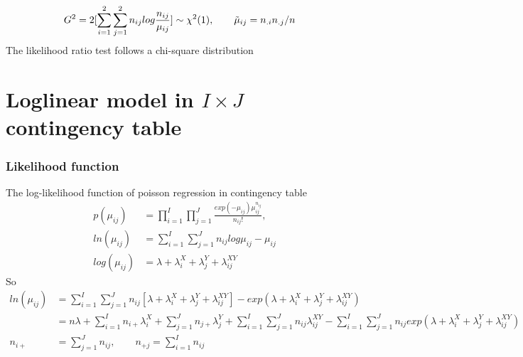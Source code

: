 \begin{align*}
G^2 &= 2[\sum_{i=1}^2 \sum_{j=1}^2 n_{ij} log \frac{n_{ij}}{\mu_{ij}}] \sim \chi^2(1), \qquad \Tilde{\mu}_{ij} = n_{.i}n_{.j}/n
\end{align*}
The likelihood ratio test follows a chi-square distribution 

\section{Loglinear model in $I \times J$ contingency table}

 \subsubsection{Likelihood function} 
The log-likelihood function of poisson regression in contingency table
\begin{align*}
	p(\mu_{ij}) &= \prod_{i=1}^I \prod_{j=1}^J \frac{exp(-\mu_{ij}) \mu_{ij}^{n_{ij}}}{n_{ij}!},  \\
	ln(\mu_{ij}) & = \sum_{i=1}^I  \sum_{j=1}^J n_{ij} log \mu_{ij} - \mu_{ij}\\
	 log(\mu_{ij}) &= \lambda + \lambda_i^X + \lambda_j^Y + \lambda_{ij}^{XY}
\end{align*}
So 
\begin{align*}
	ln(\mu_{ij}) & = \sum_{i=1}^I  \sum_{j=1}^J n_{ij} [ \lambda + \lambda_i^X + \lambda_j^Y + \lambda_{ij}^{XY}] - exp( \lambda + \lambda_i^X + \lambda_j^Y + \lambda_{ij}^{XY})\\
&= n \lambda + \sum_{i=1}^I n_{i+} \lambda_i^X + \sum_{j=1}^J n_{j+} \lambda_j^Y +  \sum_{i=1}^I \sum_{j=1}^J  n_{ij} \lambda_{ij}^{XY} -  \sum_{i=1}^I \sum_{j=1}^J  n_{ij} exp( \lambda + \lambda_i^X + \lambda_j^Y + \lambda_{ij}^{XY})\\
n_{i+} &=  \sum_{j=1}^J n_{ij}, \qquad n_{+j} =  \sum_{i=1}^I n_{ij}
\end{align*}

